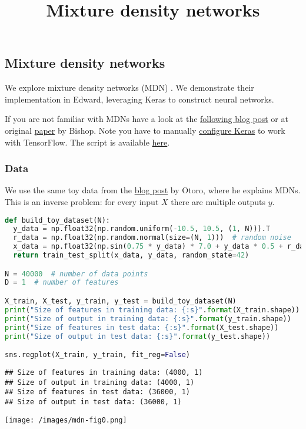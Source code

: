 \title{Mixture density networks}

\subsection{Mixture density networks}

We explore mixture density networks (MDN) \citep{bishop1994mixture}. We
demonstrate their implementation in Edward, leveraging Keras to
construct neural networks.

If you are not familiar with MDNs have a look at the
\href{http://cbonnett.github.io/MDN.html}{following blog post} or at
original
\href{http://research.microsoft.com/en-us/um/people/cmbishop/downloads/Bishop-NCRG-94-004.pdf}{paper}
by Bishop.
Note you have to manually \href{https://keras.io/backend/}
{configure Keras} to work with TensorFlow.
The script is available
\href{https://github.com/blei-lab/edward/blob/master/examples/tf_mixture_density_network_demo.py}
{here}.

\subsubsection{Data}

We use the same toy data from the \href{http://blog.otoro.net/2015/11/24/mixture-density-networks-with-tensorflow/}{blog post} by Otoro, where he explains MDNs. This is an inverse problem: for every input $X$ there are multiple outputs $y$.

\begin{lstlisting}[language=Python]
def build_toy_dataset(N):
  y_data = np.float32(np.random.uniform(-10.5, 10.5, (1, N))).T
  r_data = np.float32(np.random.normal(size=(N, 1)))  # random noise
  x_data = np.float32(np.sin(0.75 * y_data) * 7.0 + y_data * 0.5 + r_data * 1.0)
  return train_test_split(x_data, y_data, random_state=42)

N = 40000  # number of data points
D = 1  # number of features

X_train, X_test, y_train, y_test = build_toy_dataset(N)
print("Size of features in training data: {:s}".format(X_train.shape))
print("Size of output in training data: {:s}".format(y_train.shape))
print("Size of features in test data: {:s}".format(X_test.shape))
print("Size of output in test data: {:s}".format(y_test.shape))

sns.regplot(X_train, y_train, fit_reg=False)
\end{lstlisting}

\begin{lstlisting}
## Size of features in training data: (4000, 1)
## Size of output in training data: (4000, 1)
## Size of features in test data: (36000, 1)
## Size of output in test data: (36000, 1)
\end{lstlisting}
\texttt{[image: /images/mdn-fig0.png]}

